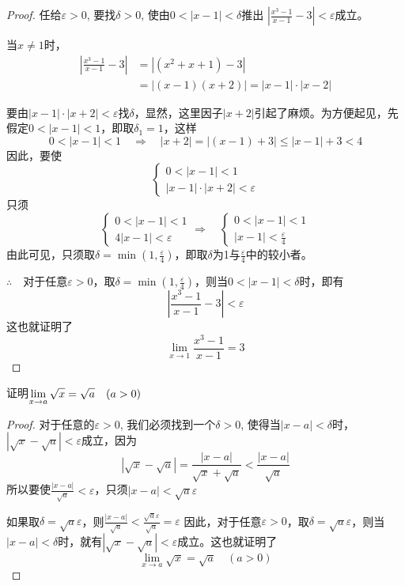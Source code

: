 \begin{proof}
    任给$\varepsilon>0$, 要找$\delta>0$, 使由$0<|x-1|<\delta$推出
    $\left|\frac{x^3-1}{x-1}-3\right|<\varepsilon$成立。

    当$x\ne 1$时，
\[\begin{split}
    \left|\frac{x^3-1}{x-1}-3\right|&=|(x^2+x+1)-3|\\
    &=|(x-1)(x+2)|=|x-1|\cdot |x-2|
\end{split}\]

要由$|x-1|\cdot |x+2|<\varepsilon$找$\delta$，显然，这里因子$|x+2|$引起了麻烦。为方便起见，先假定$0<|x-1|<1$，即取$\delta_1=1$，这样
\[0<|x-1|<1\quad\Rightarrow\quad |x+2|=|(x-1)+3|\le |x-1|+3<4\]因此，要使
\[\begin{cases}
    0<|x-1|<1\\
    |x-1|\cdot |x+2|<\varepsilon
\end{cases}\]
只须
\[\begin{cases}
    0<|x-1|<1\\
    4|x-1|<\varepsilon
\end{cases}\Rightarrow\quad \begin{cases}
    0<|x-1|<1\\
    |x-1|<\frac{\varepsilon}{4}
\end{cases}\]
由此可见，只须取$\delta=\min\left(1,\frac{\varepsilon}{4}\right)$，即取$\delta$为1与$\frac{\varepsilon}{4}$中的较小者。

$\therefore\quad $对于任意$\varepsilon>0$，取$\delta=\min\left(1,\frac{\varepsilon}{4}\right)$，则当$0<|x-1|<\delta$时，即有
\[\left|\frac{x^3-1}{x-1}-3\right|<\varepsilon\]
这也就证明了
\[\lim_{x\to 1}\frac{x^3-1}{x-1}=3\]
\end{proof}

\begin{example}
    证明$\displaystyle\lim_{x\to a}\sqrt{x}=\sqrt{a}\quad (a>0)$
\end{example}

\begin{proof}
对于任意的$\varepsilon>0$, 我们必须找到一个$\delta>0$, 使得当$|x-a|<\delta$时，$|\sqrt{x}-\sqrt{a}|<\varepsilon$成立，因为
\[|\sqrt{x}-\sqrt{a}|=\frac{|x-a|}{\sqrt{x}+\sqrt{a}}<\frac{|x-a|}{\sqrt{a}}\]
所以要使$\frac{|x-a|}{\sqrt{a}}<\varepsilon$，只须$|x-a|<\sqrt{a}\varepsilon$

如果取$\delta=\sqrt{a}\varepsilon$，则$\frac{|x-a|}{\sqrt{a}}<\frac{\sqrt{a}\varepsilon}{\sqrt{a}}=\varepsilon$
因此，对于任意$\varepsilon>0$，取$\delta=\sqrt{a}\varepsilon$，则当$|x-a|<\delta$时，就有$|\sqrt{x}-\sqrt{a}|<\varepsilon$成立。这也就证明了
\[\lim_{x\to a}\sqrt{x}=\sqrt{a}\quad (a>0)\]
\end{proof}

